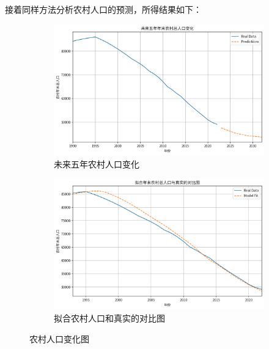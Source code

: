 接着同样方法分析农村人口的预测，所得结果如下：
\begin{figure}[H]
    \centering
    \begin{subfigure}{0.5\textwidth}
        \centering
        \includegraphics[width=\linewidth]{figures/35.png}
        \caption{未来五年农村人口变化}
        \label{fig:sub1}
    \end{subfigure}%
    \begin{subfigure}{0.5\textwidth}
        \centering
        \includegraphics[width=\linewidth]{figures/36.png}
        \caption{拟合农村人口和真实的对比图}
        \label{fig:sub2}
    \end{subfigure}
    \caption{农村人口变化图}
    \label{fig:combined}
\end{figure}

